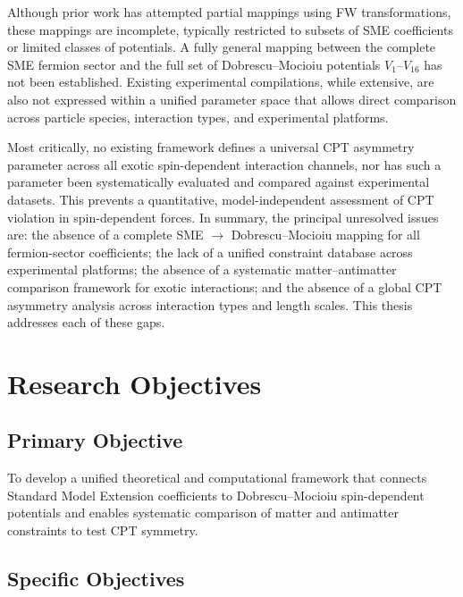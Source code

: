 \documentclass[main]{subfiles}
\begin{document}
Although prior work has attempted partial mappings using FW transformations,
these mappings are incomplete, typically restricted to subsets of SME
coefficients or limited classes of potentials. A fully general mapping between
the complete SME fermion sector and the full set of Dobrescu--Mocioiu potentials
$V_{1}$--$V_{16}$ has not been established. Existing experimental compilations,
while extensive, are also not expressed within a unified parameter space that
allows direct comparison across particle species, interaction types, and
experimental platforms.

Most critically, no existing framework defines a universal CPT asymmetry
parameter across all exotic spin-dependent interaction channels, nor has such a
parameter been systematically evaluated and compared against experimental
datasets. This prevents a quantitative, model-independent assessment of CPT
violation in spin-dependent forces. In summary, the principal unresolved issues
are: the absence of a complete SME $\to$ Dobrescu--Mocioiu mapping for all
fermion-sector coefficients; the lack of a unified constraint database across
experimental platforms; the absence of a systematic matter--antimatter
comparison framework for exotic interactions; and the absence of a global CPT
asymmetry analysis across interaction types and length scales. This thesis
addresses each of these gaps.

\section{Research Objectives}

\subsection*{Primary Objective}

To develop a unified theoretical and computational framework that connects
Standard Model Extension coefficients to Dobrescu--Mocioiu spin-dependent
potentials and enables systematic comparison of matter and antimatter
constraints to test CPT symmetry.

\subsection*{Specific Objectives}
\end{document}
